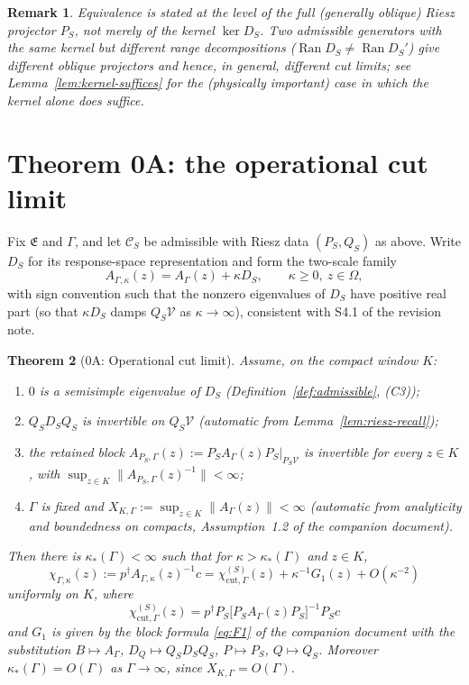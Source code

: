 \documentclass[11pt]{article}
\newtheorem{theorem}{Theorem}[section]
\newtheorem{remark}[theorem]{Remark}
\newcommand{\Ran}{\operatorname{Ran}}
\renewcommand{\S}{\mathfrak S}
\newcommand{\E}{\mathfrak E}
\begin{document}
\begin{remark}
Equivalence is stated at the level of the full (generally oblique) Riesz
projector $P_S$, not merely of the kernel $\ker D_S$. Two admissible
generators with the same kernel but different range decompositions
($\Ran D_S\ne\Ran D_S'$) give different oblique projectors and hence, in
general, different cut limits; see Lemma~\ref{lem:kernel-suffices} for
the (physically important) case in which the kernel alone does suffice.
\end{remark}

\section{Theorem 0A: the operational cut limit}

Fix $\E$ and $\Gamma$, and let $\mathcal C_S$ be admissible with Riesz
data $(P_S,Q_S)$ as above. Write $D_S$ for its response-space
representation and form the two-scale family
\[
A_{\Gamma,\kappa}(z)=A_\Gamma(z)+\kappa D_S,
\qquad \kappa\ge0,\ z\in\Omega,
\]
with sign convention such that the nonzero eigenvalues of $D_S$ have
positive real part (so that $\kappa D_S$ damps $Q_S\mathcal V$ as
$\kappa\to\infty$), consistent with \S4.1 of the revision note.

\begin{theorem}[0A: Operational cut limit]
\label{thm:0A}
Assume, on the compact window $K$:
\begin{enumerate}[label=(H0\arabic*),nosep]
\item $0$ is a semisimple eigenvalue of $D_S$ (Definition~\ref{def:admissible}, (C3));
\item $Q_SD_SQ_S$ is invertible on $Q_S\mathcal V$ (automatic from
      Lemma~\ref{lem:riesz-recall});
\item the \emph{retained block}
      $A_{P_S,\Gamma}(z):=P_SA_\Gamma(z)P_S|_{P_S\mathcal V}$ is invertible
      for every $z\in K$, with $\sup_{z\in K}\|A_{P_S,\Gamma}(z)^{-1}\|<\infty$;
\item $\Gamma$ is fixed and $X_{K,\Gamma}:=\sup_{z\in K}\|A_\Gamma(z)\|<\infty$
      (automatic from analyticity and boundedness on compacts,
      Assumption~1.2 of the companion document).
\end{enumerate}
Then there is $\kappa_*(\Gamma)<\infty$ such that for $\kappa>\kappa_*(\Gamma)$
and $z\in K$,
\[
\chi_{\Gamma,\kappa}(z):=p^\dagger A_{\Gamma,\kappa}(z)^{-1}c
=\chi_{\mathrm{cut},\Gamma}^{(S)}(z)+\kappa^{-1}G_1(z)+O(\kappa^{-2})
\]
uniformly on $K$, where
\[
\boxed{\;
\chi_{\mathrm{cut},\Gamma}^{(S)}(z)
=p^\dagger P_S\bigl[P_SA_\Gamma(z)P_S\bigr]^{-1}P_Sc
\;}
\label{eq:0A}
\tag{0.2}
\]
and $G_1$ is given by the block formula \eqref{eq:F1} of the companion
document with the substitution $B\mapsto A_\Gamma$, $D_Q\mapsto Q_SD_SQ_S$,
$P\mapsto P_S$, $Q\mapsto Q_S$. Moreover $\kappa_*(\Gamma)=O(\Gamma)$ as
$\Gamma\to\infty$, since $X_{K,\Gamma}=O(\Gamma)$.
\end{theorem}
\end{document}
